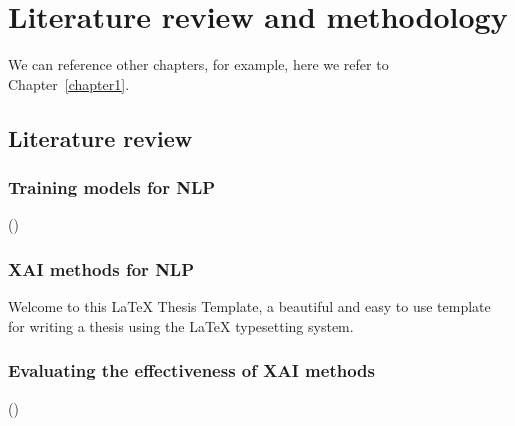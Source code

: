 \chapter{Literature review and methodology} %


\label{chapter2} %

We can reference other chapters, for example, here we refer to Chapter~\ref{chapter1}.


\newcommand{\keyword}[1]{\textbf{#1}}
\newcommand{\tabhead}[1]{\textbf{#1}}
\newcommand{\code}[1]{\texttt{#1}}
\newcommand{\file}[1]{\texttt{\bfseries#1}}
\newcommand{\option}[1]{\texttt{\itshape#1}}


\section{Literature review}
\subsection{Training models for NLP}
(\cite{katz_nlp_legal})

\subsection{XAI methods for NLP}
Welcome to this \LaTeX{} Thesis Template, a beautiful and easy to use template for writing a thesis using the \LaTeX{} typesetting system.


\subsection{Evaluating the effectiveness of XAI methods}
(\cite{doshi-velez2017})


